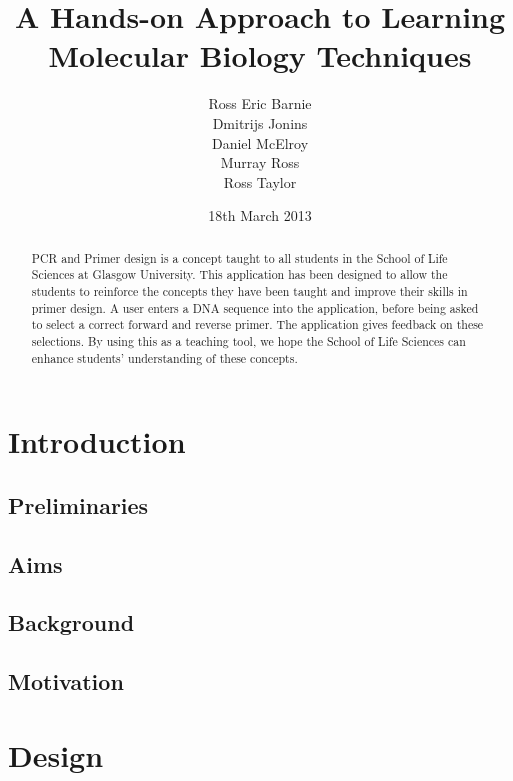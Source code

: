 \documentclass{l3proj}
\title{A Hands-on Approach to Learning Molecular Biology Techniques}
\author{
  Ross Eric Barnie \\
  Dmitrijs Jonins \\
  Daniel McElroy \\
  Murray Ross \\
  Ross Taylor
}
\date{18th March 2013}
\begin{document}
\maketitle
\begin{abstract}

PCR and Primer design is a concept taught to all students in the School of Life Sciences at Glasgow
University. This application has been designed to allow the students to reinforce the concepts they have
been taught and improve their skills in primer design. A user enters a DNA sequence into the application,
before being asked to select a correct forward and reverse primer. The application gives feedback on these
selections. By using this as a teaching tool, we hope the School of Life Sciences
can enhance students' understanding of these concepts.

\end{abstract}

\educationalconsent
\tableofcontents

\chapter{Introduction}
\label{intro}

\section{Preliminaries}
\label{intro:prelims}


\section{Aims}
\label{intro:aims}


\section{Background}
\label{intro:background}


\section{Motivation}
\label{intro:motiv}


\chapter{Design}
\label{design}
\end{document}

